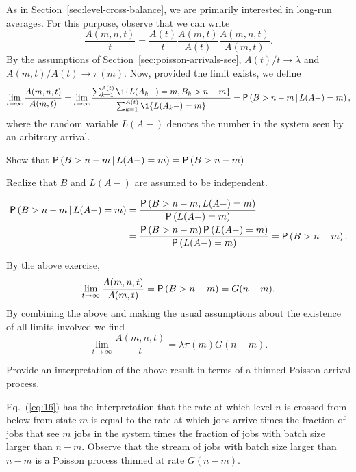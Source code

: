 As in Section~\ref{sec:level-cross-balance}, we are primarily interested in  long-run averages. For this purpose, observe that we can write
\begin{equation}\label{eq:16}
  \frac{A(m,n,t)}t =   \frac{A(t)}t \frac{A(m,t)}{A(t)}\frac{A(m,n,t)}{A(m,t)}.
\end{equation}
By the assumptions of Section~\ref{sec:poisson-arrivals-see},  $A(t)/t\to\lambda$ and $A(m,t)/A(t)\to\pi(m)$.  Now, provided the limit exists, we define
\begin{equation}\label{eq:1332}
\lim_{t\to\infty} \frac{A(m,n,t)}{A(m,t)} = 
\lim_{t\to\infty} \frac{\sum_{k=1}^{A(t)}\1{L(A_k-) = m, B_k > n-m}}
{\sum_{k=1}^{A(t)}\1{L(A_k-) = m}}=\P{B>n-m\given L(A-)=m},
\end{equation}
where the random variable $L(A-)$   denotes the number in the system seen by an arbitrary arrival.

\begin{exercise}[\faFlask]
Show that $\P{B>n-m\given L(A-)=m}=\P{B>n-m}$.
  \begin{hint}
    Realize that $B$ and $L(A-)$ are assumed to be independent.
  \end{hint}
\begin{solution}
\begin{equation*}
  \begin{split}
\P{B>n-m\given L(A-)=m} &=
\frac{\P{B>n-m,L(A-)=m}}{\P{L(A-)=m}}\\
&=\frac{\P{B>n-m}\P{L(A-)=m}}{\P{L(A-)=m}} = \P{B>n-m}.
  \end{split}
\end{equation*}
\end{solution}
\end{exercise}

By the above exercise,
\begin{equation*}
\lim_{t\to\infty} \frac{A(m,n,t)}{A(m,t)} = \P{B>n-m} = G(n-m).
\end{equation*} 
By combining the above and making the usual assumptions about the
existence of all limits involved we find
\begin{equation*}
\lim_{t\to\infty}   \frac{A(m,n,t)}t = \lambda \pi(m) G(n-m).
\end{equation*}

\begin{exercise}[\faFlask]
Provide an interpretation of the above result in terms of a thinned Poisson arrival process.
\begin{solution}
Eq.~(\ref{eq:16}) has the interpretation that the rate at which
level $n$ is crossed from below from state $m$ is equal to the rate at
which jobs arrive times the fraction of jobs that see $m$ jobs in the
system times the fraction of jobs with batch size larger than $n-m$.
Observe that the stream of jobs with batch size larger than $n-m$
is a Poisson process thinned at rate $G(n-m)$. 
\end{solution}
\end{exercise}



